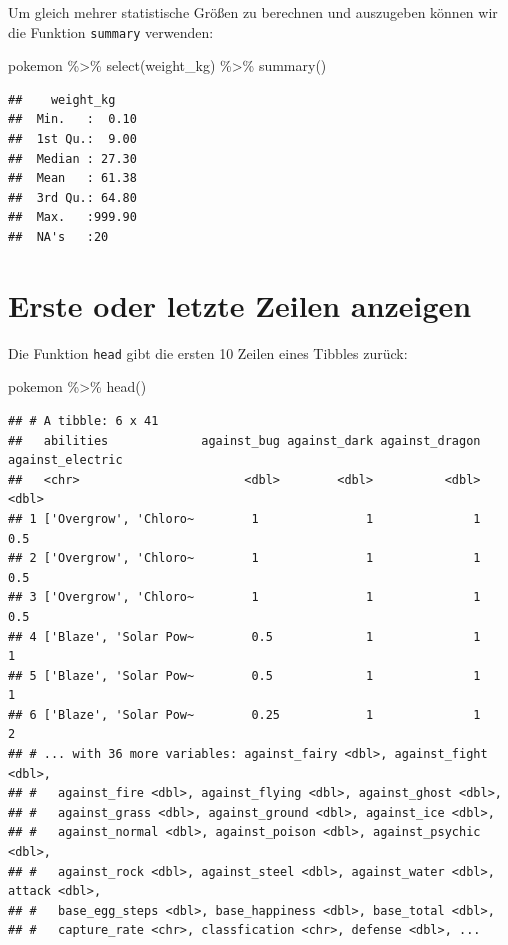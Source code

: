 \documentclass[
]{book}
\newenvironment{Shaded}{\begin{snugshade}}{\end{snugshade}}
\newcommand{\FunctionTok}[1]{\textcolor[rgb]{0.00,0.00,0.00}{#1}}
\newcommand{\NormalTok}[1]{#1}
\newcommand{\SpecialCharTok}[1]{\textcolor[rgb]{0.00,0.00,0.00}{#1}}
\begin{document}
Um gleich mehrer statistische Größen zu berechnen und auszugeben können wir die Funktion \texttt{summary} verwenden:

\begin{Shaded}
\begin{Highlighting}[]
\NormalTok{pokemon }\SpecialCharTok{\%\textgreater{}\%}
  \FunctionTok{select}\NormalTok{(weight\_kg) }\SpecialCharTok{\%\textgreater{}\%}
  \FunctionTok{summary}\NormalTok{()}
\end{Highlighting}
\end{Shaded}

\begin{verbatim}
##    weight_kg     
##  Min.   :  0.10  
##  1st Qu.:  9.00  
##  Median : 27.30  
##  Mean   : 61.38  
##  3rd Qu.: 64.80  
##  Max.   :999.90  
##  NA's   :20
\end{verbatim}

\hypertarget{erste-oder-letzte-zeilen-anzeigen}{%
\section{Erste oder letzte Zeilen anzeigen}\label{erste-oder-letzte-zeilen-anzeigen}}

Die Funktion \texttt{head} gibt die ersten 10 Zeilen eines Tibbles zurück:

\begin{Shaded}
\begin{Highlighting}[]
\NormalTok{pokemon }\SpecialCharTok{\%\textgreater{}\%}
  \FunctionTok{head}\NormalTok{()}
\end{Highlighting}
\end{Shaded}

\begin{verbatim}
## # A tibble: 6 x 41
##   abilities             against_bug against_dark against_dragon against_electric
##   <chr>                       <dbl>        <dbl>          <dbl>            <dbl>
## 1 ['Overgrow', 'Chloro~        1               1              1              0.5
## 2 ['Overgrow', 'Chloro~        1               1              1              0.5
## 3 ['Overgrow', 'Chloro~        1               1              1              0.5
## 4 ['Blaze', 'Solar Pow~        0.5             1              1              1  
## 5 ['Blaze', 'Solar Pow~        0.5             1              1              1  
## 6 ['Blaze', 'Solar Pow~        0.25            1              1              2  
## # ... with 36 more variables: against_fairy <dbl>, against_fight <dbl>,
## #   against_fire <dbl>, against_flying <dbl>, against_ghost <dbl>,
## #   against_grass <dbl>, against_ground <dbl>, against_ice <dbl>,
## #   against_normal <dbl>, against_poison <dbl>, against_psychic <dbl>,
## #   against_rock <dbl>, against_steel <dbl>, against_water <dbl>, attack <dbl>,
## #   base_egg_steps <dbl>, base_happiness <dbl>, base_total <dbl>,
## #   capture_rate <chr>, classfication <chr>, defense <dbl>, ...
\end{verbatim}
\end{document}
